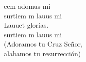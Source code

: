 \begin{cancion}%
	cem adomus mi\\
	surtiem m lauus mi \\
	Lauuet glorias.\\
	surtiem m lauus mi\\
(Adoramos tu Cruz Señor,\\
 alabamos tu resurrección)\\
\end{cancion}%
